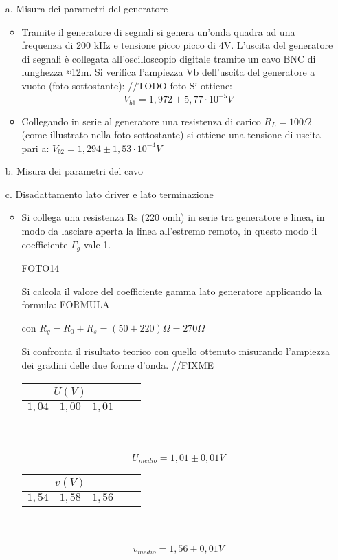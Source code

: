 \documentclass[a4paper]{article}
\begin{document}
\begin{enumerate}
\item [a.]Misura dei parametri del generatore
      \begin{itemize}
      \item Tramite il generatore di segnali si genera un'onda quadra ad una frequenza di 200 kHz e tensione picco picco di 4V. L'uscita del generatore di segnali è collegata all'oscilloscopio digitale tramite un cavo BNC di lunghezza ≈12m.
      Si verifica l’ampiezza Vb dell’uscita del generatore a vuoto (foto sottostante): //TODO foto
Si ottiene: \[V_{b1}=1,972 \pm 5,77\cdot10^{-5} V\]
\item Collegando in serie al generatore una resistenza di carico \(R_L=100\Omega\)  (come illustrato nella foto sottostante) si ottiene una tensione di uscita pari a: \(V_{b2}=1,294\pm1,53\cdot10^{-4} V\)
      \end{itemize}
\item [b.]Misura dei parametri del cavo
\item [c.]Disadattamento lato driver e lato terminazione
  \begin{itemize}
    \item Si collega una resistenza Rs (220 omh) in serie tra generatore e linea, in modo da lasciare aperta la linea all’estremo remoto, in questo modo il coefficiente \(\Gamma_g\) vale 1.

FOTO14

Si calcola il valore del coefficiente gamma lato generatore applicando la formula: 
FORMULA

con \(R_g=R_0+R_s=(50+220)\Omega=270\Omega\)

Si confronta il risultato teorico con quello ottenuto misurando l’ampiezza dei gradini delle due forme d’onda. //FIXME

 \begin{tabular}{|r|l|l|l|l|}
     \hline
     \multicolumn{3}{|c|}{\(U (V)\)} \\
     \hline
     \(1,04\) & \(1,00\) & \(1,01\)\\
     \hline
   \end{tabular} \\ \\
\[U_{medio}=1,01 \pm 0,01V\]

\begin{tabular}{|r|l|l|l|l|}
     \hline
     \multicolumn{3}{|c|}{\(v (V)\)} \\
     \hline
     \(1,54\) & \(1,58\) & \(1,56\)\\
     \hline
   \end{tabular} \\ \\
\[v_{medio}=1,56 \pm 0,01V\]


\end{itemize}
\end{enumerate}
\end{document}
